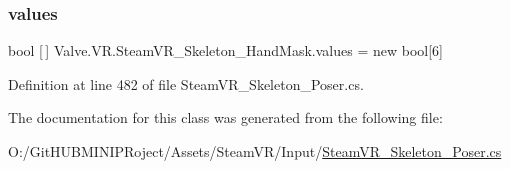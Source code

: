 \subsubsection{\texorpdfstring{values}{values}}
{\footnotesize\ttfamily bool \mbox{[}$\,$\mbox{]} Valve.\+V\+R.\+Steam\+V\+R\+\_\+\+Skeleton\+\_\+\+Hand\+Mask.\+values = new bool\mbox{[}6\mbox{]}}



Definition at line 482 of file Steam\+V\+R\+\_\+\+Skeleton\+\_\+\+Poser.\+cs.



The documentation for this class was generated from the following file\+:\begin{DoxyCompactItemize}
\item 
O\+:/\+Git\+H\+U\+B\+M\+I\+N\+I\+P\+Roject/\+Assets/\+Steam\+V\+R/\+Input/\mbox{\hyperlink{_steam_v_r___skeleton___poser_8cs}{Steam\+V\+R\+\_\+\+Skeleton\+\_\+\+Poser.\+cs}}\end{DoxyCompactItemize}
